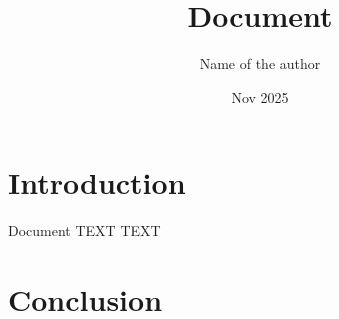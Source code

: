 \documentclass{coursepaper}
\title{Document}
\author{Name of the author}
\date{Nov 2025}
\begin{document}
\maketitle

\section{Introduction}

Document TEXT TEXT

\section{Conclusion} \label{Here is conclusion}





 
\end{document}
